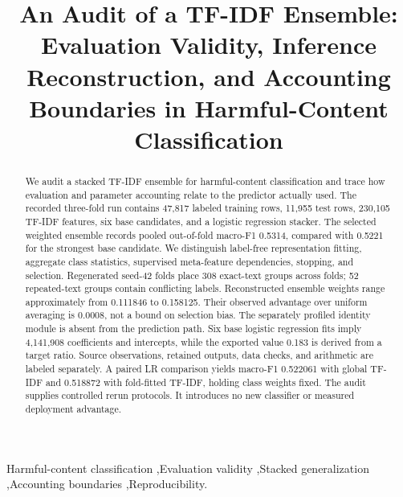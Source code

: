 \documentclass[doublecolumn]{ijcvsplatex}
\newif\ifNamedCase
\begin{document}
\begin{frontmatter}

\ifNamedCase
\title{\LARGE LightBanglaHC Audit: Evaluation Validity, Inference Reconstruction, and Accounting Boundaries in Harmful-Content Classification}
\else
\title{\LARGE An Audit of a TF-IDF Ensemble: Evaluation Validity, Inference Reconstruction, and Accounting Boundaries in Harmful-Content Classification}
\fi

% 

\begin{abstract}
We audit a stacked TF-IDF ensemble for harmful-content classification and trace how evaluation and parameter accounting relate to the predictor actually used. The recorded three-fold run contains 47,817 labeled training rows, 11,955 test rows, 230,105 TF-IDF features, six base candidates, and a logistic regression stacker. The selected weighted ensemble records pooled out-of-fold macro-F1 0.5314, compared with 0.5221 for the strongest base candidate. We distinguish label-free representation fitting, aggregate class statistics, supervised meta-feature dependencies, stopping, and selection. Regenerated seed-42 folds place 308 exact-text groups across folds; 52 repeated-text groups contain conflicting labels. Reconstructed ensemble weights range approximately from 0.111846 to 0.158125. Their observed advantage over uniform averaging is 0.0008, not a bound on selection bias. The separately profiled identity module is absent from the prediction path. Six base logistic regression fits imply 4,141,908 coefficients and intercepts, while the exported value 0.183 is derived from a target ratio. Source observations, retained outputs, data checks, and arithmetic are labeled separately. A paired LR comparison yields macro-F1 0.522061 with global TF-IDF and 0.518872 with fold-fitted TF-IDF, holding class weights fixed. The audit supplies controlled rerun protocols. It introduces no new classifier or measured deployment advantage.
\end{abstract}

\begin{keyword}
Harmful-content classification \sep Evaluation validity \sep Stacked
generalization \sep Accounting boundaries \sep Reproducibility.
\end{keyword}
\end{frontmatter}
\end{document}
